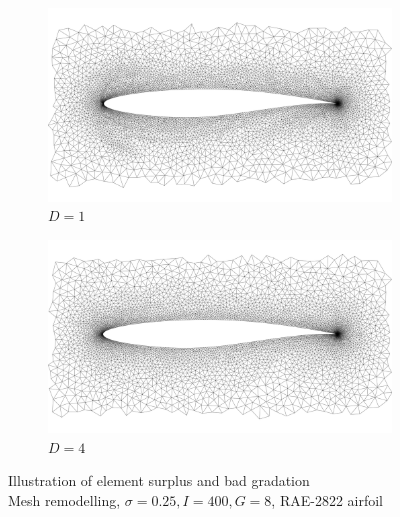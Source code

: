 \begin{figure}[!h]
\begin{center}
%	
%	
\begin{subfigure}{0.49\linewidth}
	\includegraphics[width=\linewidth]{pictures/mesh_d1}
	\caption{$D=1$}
\end{subfigure}
\hspace{0.01\linewidth}
\begin{subfigure}{0.49\linewidth}
	\includegraphics[width=\linewidth]{pictures/mesh_d4}
	\caption{$D=4$}
\end{subfigure}
\end{center}
\caption{Illustration of element surplus and bad gradation\\\footnotesize Mesh remodelling, $\sigma=0.25, I=400, G=8$, RAE-2822 airfoil}
\end{figure}